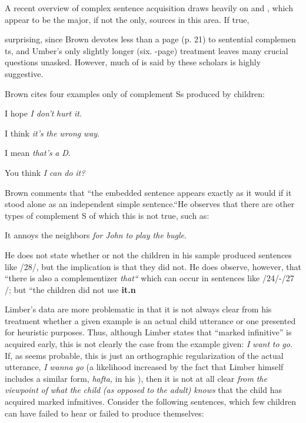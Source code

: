 A recent overview of complex sentence acquisition \citep{Bowerman1979} draws heavily on \citet{Brown1973} and \citet{Limber1973}, which
appear to be the major, if not the only, sources in this area. If true,

surprising, since Brown devotes less than a page (p. 21) to sentential complemen ts, and Umber's only slightly longer (six. -page) treatment leaves many crucial questions unasked. However, much of
is said by these scholars is highly suggestive.

Brown cites four examples only of complement Ss produced by children:

\ea\label{ex:24}
 I hope \textit{I} \textit{don't} \textit{hurt} \textit{it}.
\z

\ea\label{ex:25}
 I think \textit{it's} \textit{the} \textit{wrong} \textit{way}.
\z

\ea\label{ex:26}
 I mean \textit{that's} \textit{a} \textit{D}.
\z

\ea\label{ex:27}
 You think \textit{I} \textit{can} \textit{do} \textit{it?}
\z

Brown comments that ``the embedded sentence appears exactly as it would if it stood alone as an independent simple sentence.``He observes that there are other types of complement S of which this is not true, such as:

\ea\label{ex:28}
 It annoys the neighbors \textit{for} \textit{John} \textit{to} \textit{play the} \textit{bugle}.
\z

He does not state whether or not the children in his sample produced sentences like /28/, but the implication is that they did not. He does observe, however, that ``there is also a complementizer \textit{that``} which can occur in sentences like /24/-/27 /; but ``the children did not use \textbf{it.n}

Limber's data are more problematic in that it is not always clear from his treatment whether a given example is an actual child utterance or one presented for heuristic purposes. Thus, although Limber states that ``marked infinitive'' is acquired early, this is not clearly the case from the example given: \textit{I} \textit{want} \textit{to} \textit{go.} If, as seems probable, this is just an orthographic regularization of the actual utterance, \textit{I} \textit{wanna} \textit{go} (a likelihood increased by the fact that Limber himself includes a similar form, \textit{h}\textit{a}\textit{fta,} in his ), then it is not at all clear \textit{from} \textit{the} \textit{viewpoint} \textit{of} \textit{what} \textit{the} \textit{child }\textit{(as} \textit{opposed} \textit{to} \textit{the} \textit{adult)} \textit{knows} that the child has acquired marked infmitives. Consider the following sentences, which few children can have failed to hear or failed to produce themselves:

